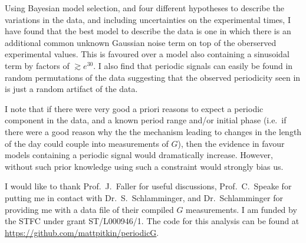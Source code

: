 \documentclass[page-classic]{epl2}
\begin{document}
Using Bayesian model selection, and four different hypotheses to describe the variations in the data, and including
uncertainties on the experimental times, I have found that the best model to describe the data is one in which
there is an additional common unknown Gaussian noise term on top of the oberserved experimental values. This is 
favoured over a model also containing a sinusoidal term by factors of $\gtrsim e^{30}$. I also find that periodic
signals can easily be found in random permutations of the data suggesting that the observed periodicity seen in
\cite{2015EL....11010002A} is just a random artifact of the data.

I note that if there were very good a priori reasons to expect a periodic component in the data, and a known
period range and/or initial phase (i.e.\ if there were a good reason why the the mechanism leading to changes in the
length of the day could couple into measurements of $G$), then the evidence in favour models containing a periodic
signal would dramatically increase. However, without such prior knowledge using such a constraint would strongly bias
us.

\acknowledgements

I would like to thank Prof.\ J.\ Faller for useful discussions, Prof.\ C.\ Speake for putting me in contact with
Dr.\ S.\ Schlamminger, and Dr.\ Schlamminger for providing me with a data file of their compiled $G$ measurements.
I am funded by the STFC under grant ST/L000946/1. The code for this analysis can be found at \url{https://github.com/mattpitkin/periodicG}.



\end{document}
